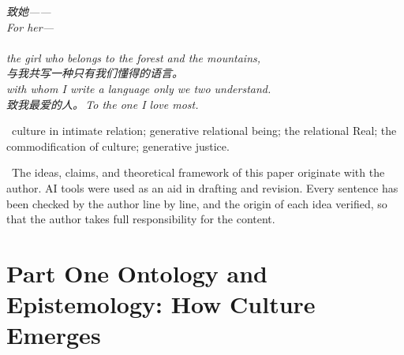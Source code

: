 
\thispagestyle{empty}
\null\vfill
\begin{center}
\begin{minipage}{0.74\linewidth}
\centering\itshape\color{rose}
{\cjk 致她——}\\[0.3em]
For her---\\[0.7em]
\\[0.2em]
the girl who belongs to the forest and the mountains,\\[0.5em]
{\cjk 与我共写一种只有我们懂得的语言。}\\[0.2em]
with whom I write a language only we two understand.\\[1.0em]
{\upshape\footnotesize\color{gold} {\cjk 致我最爱的人。}\,\;To the one I love most.}
\end{minipage}
\end{center}
\vfill\null
\clearpage



\vspace{1.2em}
\, \textcolor{inksoft}{culture in intimate relation; generative relational being; the relational Real; the commodification of culture; generative justice.}

\vspace{1.0em}
\, \textcolor{inksoft}{The ideas, claims, and theoretical framework of this paper originate with the author. AI tools were used as an aid in drafting and revision. Every sentence has been checked by the author line by line, and the origin of each idea verified, so that the author takes full responsibility for the content.}
\newpage

\newpage

\part*{\textcolor{rosedeep}{Part One \quad Ontology and Epistemology: How Culture Emerges}}

